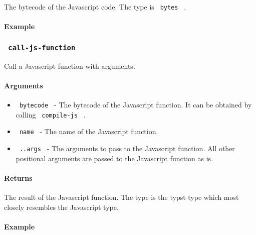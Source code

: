 The bytecode of the Javascript code. The type is \texttt{\ bytes\ } .

\paragraph{Example}\label{example-2}

\begin{Shaded}
\begin{Highlighting}[]
\end{Highlighting}
\end{Shaded}

\subsubsection{\texorpdfstring{\texttt{\ call-js-function\ }}{ call-js-function }}\label{call-js-function}

Call a Javascript function with arguments.

\paragraph{Arguments}\label{arguments-2}

\begin{itemize}
\tightlist
\item
  \texttt{\ bytecode\ } - The bytecode of the Javascript function. It
  can be obtained by calling \texttt{\ compile-js\ } .
\item
  \texttt{\ name\ } - The name of the Javascript function.
\item
  \texttt{\ ..args\ } - The arguments to pass to the Javascript
  function. All other positional arguments are passed to the Javascript
  function as is.
\end{itemize}

\paragraph{Returns}\label{returns-2}

The result of the Javascript function. The type is the typst type which
most closely resembles the Javascript type.

\paragraph{Example}\label{example-3}

